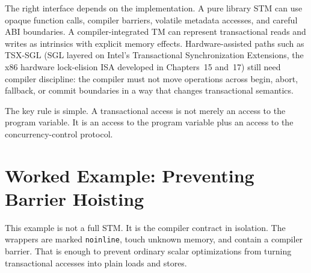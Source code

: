 The right interface depends on the implementation.  A pure library STM can use opaque function calls, compiler barriers, volatile metadata accesses, and careful ABI boundaries.  A compiler-integrated TM can represent transactional reads and writes as intrinsics with explicit memory effects.  Hardware-assisted paths such as TSX-SGL (SGL layered on Intel's Transactional Synchronization Extensions, the x86 hardware lock-elision ISA developed in Chapters~15 and~17) still need compiler discipline: the compiler must not move operations across begin, abort, fallback, or commit boundaries in a way that changes transactional semantics.

The key rule is simple.  A transactional access is not merely an access to the program variable.  It is an access to the program variable plus an access to the concurrency-control protocol.

\section{Worked Example: Preventing Barrier Hoisting}
\label{sec:barrier-hoisting-example}

This example is not a full STM.  It is the compiler contract in isolation.
The wrappers are marked \texttt{noinline}, touch unknown memory, and contain a
compiler barrier.  That is enough to prevent ordinary scalar optimizations from
turning transactional accesses into plain loads and stores.

